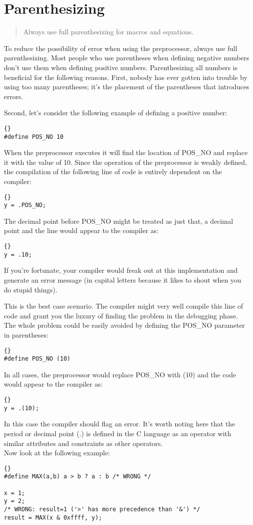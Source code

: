 \documentclass{report}
\begin{document}
\section{Parenthesizing} 
\begin{quote}
Always use full parenthesizing for macros and equations.
\end{quote}
To reduce the possibility of error when using the preprocessor, always use full parenthesizing. Most people who use parentheses when defining negative numbers don't use them when defining positive numbers. Parenthesizing all numbers is beneficial for the following reasons. First, nobody has ever gotten into trouble by using too many parentheses; it's the placement of the parentheses that introduces errors.

Second, let's consider the following example of defining a positive number: 
\begin{lstlisting}{}
#define POS_NO 10
\end{lstlisting}
When the preprocessor executes it will find the location of POS\_NO and replace it with the value of 10. Since the operation of the preprocessor is weakly defined, the compilation of the following line of code is entirely dependent on the compiler: 
\begin{lstlisting}{}
y = .POS_NO;
\end{lstlisting}
The decimal point before POS\_NO might be treated as just that, a decimal point and the line would appear to the compiler as: 
\begin{lstlisting}{}
y = .10;
\end{lstlisting}
If you're fortunate, your compiler would freak out at this implementation and generate an error message (in capital letters because it likes to shout when you do stupid things).

This is the best case scenario. The compiler might very well compile this line of code and grant you the luxury of finding the problem in the debugging phase. The whole problem could be easily avoided by defining the POS\_NO parameter in parentheses: 
\begin{lstlisting}{}
#define POS_NO (10)
\end{lstlisting}
In all cases, the preprocessor would replace POS\_NO with (10) and the code would appear to the compiler as: 
\begin{lstlisting}{}
y = .(10);
\end{lstlisting}
In this case the compiler should flag an error. It's worth noting here that the period or decimal point (.) is defined in the C language as an operator with similar attributes and constraints as other operators.\\
Now look at the following example: 
\begin{lstlisting}{}
#define MAX(a,b) a > b ? a : b /* WRONG */

x = 1; 
y = 2; 
/* WRONG: result=1 ('>' has more precedence than '&') */
result = MAX(x & 0xffff, y);
\end{lstlisting}
\end{document}
